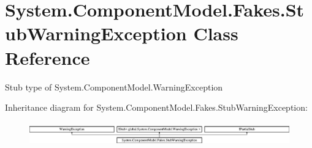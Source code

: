 \hypertarget{class_system_1_1_component_model_1_1_fakes_1_1_stub_warning_exception}{\section{System.\-Component\-Model.\-Fakes.\-Stub\-Warning\-Exception Class Reference}
\label{class_system_1_1_component_model_1_1_fakes_1_1_stub_warning_exception}
}


Stub type of System.\-Component\-Model.\-Warning\-Exception 


Inheritance diagram for System.\-Component\-Model.\-Fakes.\-Stub\-Warning\-Exception\-:\begin{figure}[H]
\begin{center}
\leavevmode
\includegraphics[height=1.042830cm]{class_system_1_1_component_model_1_1_fakes_1_1_stub_warning_exception}
\end{center}
\end{figure}
